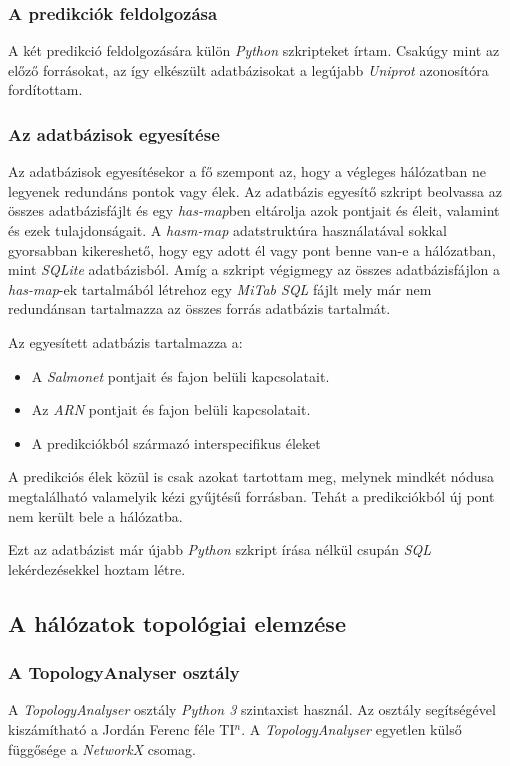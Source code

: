 \documentclass[a4paper,12pt]{article}
\begin{document}
			\subsubsection{A predikciók feldolgozása} 
			A két predikció feldolgozására külön \textit{Python} szkripteket írtam. Csakúgy mint az előző forrásokat, az így elkészült adatbázisokat a legújabb \textit{Uniprot} azonosítóra fordítottam.
			
			
		

	\subsubsection{Az adatbázisok egyesítése}
		Az adatbázisok egyesítésekor a fő szempont az, hogy a végleges hálózatban ne legyenek redundáns pontok vagy élek. Az adatbázis egyesítő szkript beolvassa az összes adatbázisfájlt és egy \textit{has-map}ben eltárolja azok pontjait és éleit, valamint és ezek tulajdonságait. A \textit{hasm-map} adatstruktúra használatával sokkal gyorsabban kikereshető, hogy egy adott él vagy pont benne van-e a hálózatban, mint \textit{SQLite} adatbázisból. Amíg a szkript végigmegy az összes adatbázisfájlon a \textit{has-map}-ek tartalmából létrehoz egy \textit{MiTab SQL} fájlt mely már nem redundánsan tartalmazza az összes forrás adatbázis tartalmát.
		
		Az egyesített adatbázis tartalmazza a:
		\begin{itemize}
			\item A \textit{Salmonet} pontjait és fajon belüli kapcsolatait.
			\item Az \textit{ARN} pontjait és fajon belüli kapcsolatait.
			\item A predikciókból származó interspecifikus éleket
		\end{itemize}
		 
		 A predikciós élek közül is csak azokat tartottam meg, melynek mindkét nódusa megtalálható valamelyik kézi gyűjtésű forrásban. Tehát a predikciókból új pont nem került bele a hálózatba.
		
		Ezt az adatbázist már újabb \textit{Python} szkript írása nélkül csupán \textit{SQL} lekérdezésekkel hoztam létre.

	\subsection{A hálózatok topológiai elemzése}
	
		\subsubsection{A TopologyAnalyser osztály}
		A \textit{TopologyAnalyser} osztály \textit{Python 3} szintaxist használ. Az osztály segítségével kiszámítható a Jordán Ferenc féle TI$^n$. A \textit{TopologyAnalyser} egyetlen külső függősége a \textit{NetworkX} csomag. 
		
\end{document}
